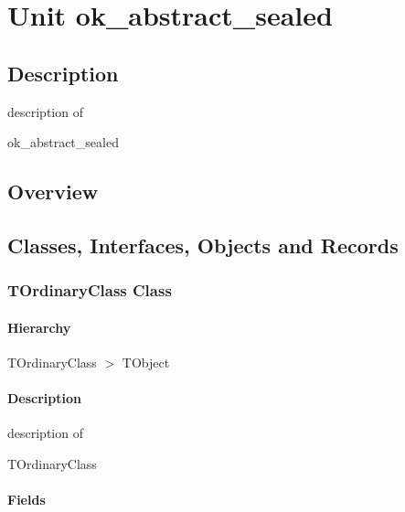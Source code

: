 \documentclass{report}
\begin{document}
\newlength{\tmplength}
\chapter{Unit ok{\_}abstract{\_}sealed}
\section{Description}
description of \begin{ttfamily}ok{\_}abstract{\_}sealed\end{ttfamily}
\section{Overview}
\begin{description}
\item[\texttt{\begin{ttfamily}TOrdinaryClass\end{ttfamily} Class}]
\item[\texttt{\begin{ttfamily}TAbstractClass\end{ttfamily} Class}]
\item[\texttt{\begin{ttfamily}TSealedClass\end{ttfamily} Class}]
\end{description}
\section{Classes, Interfaces, Objects and Records}
\subsection*{TOrdinaryClass Class}
\subsubsection*{\large{\textbf{Hierarchy}}\normalsize\hspace{1ex}\hfill}
TOrdinaryClass {$>$} TObject
\subsubsection*{\large{\textbf{Description}}\normalsize\hspace{1ex}\hfill}
description of \begin{ttfamily}TOrdinaryClass\end{ttfamily}\subsubsection*{\large{\textbf{Fields}}\normalsize\hspace{1ex}\hfill}
\end{document}
